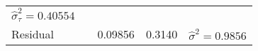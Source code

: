 \documentclass[12pt,]{article}
\begin{document}
\begin{longtable}[]{@{}lllll@{}}
\begin{minipage}[t]{0.40\columnwidth}
\(\hat\sigma^2_{\tau}=0.40554\)\strut
\end{minipage}\tabularnewline
\begin{minipage}[t]{0.10\columnwidth}\raggedright
Residual\strut
\end{minipage} & \begin{minipage}[t]{0.13\columnwidth}\raggedright
\strut
\end{minipage} & \begin{minipage}[t]{0.11\columnwidth}\raggedright
0.09856\strut
\end{minipage} & \begin{minipage}[t]{0.11\columnwidth}\raggedright
0.3140\strut
\end{minipage} & \begin{minipage}[t]{0.40\columnwidth}\raggedright
\(\hat\sigma^2=0.9856\)\strut
\end{minipage}\tabularnewline
\bottomrule
\end{longtable}
\end{document}
